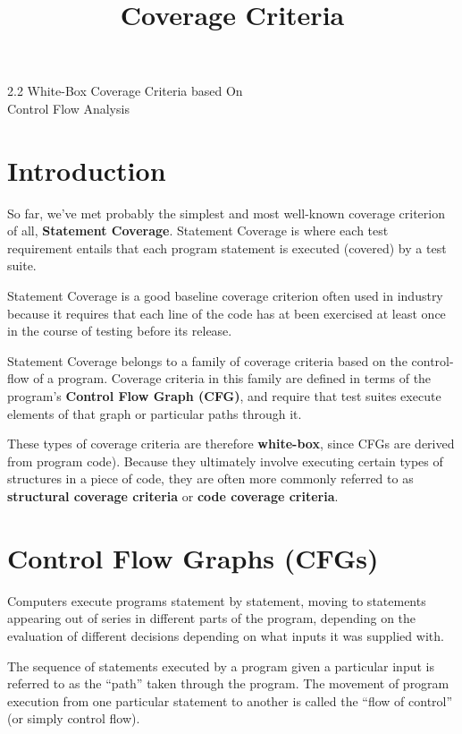 



\title{Coverage Criteria}{2.2 White-Box Coverage Criteria based On\\ Control Flow Analysis}


\section{Introduction}
%
So far, we've met probably the simplest and most well-known coverage criterion
of all, {\bf Statement Coverage}. Statement Coverage is where each test
requirement entails that each program statement is executed (covered) by a test
suite. 

Statement Coverage is a good baseline coverage criterion often used in industry
because it requires that each line of the code has at been exercised at least
once in the course of testing before its release.

Statement Coverage belongs to a family of coverage criteria based on the
control-flow of a program. Coverage criteria in this family are defined in terms
of the program's {\bf Control Flow Graph (CFG)}, and require that test suites
execute elements of that graph or particular paths through it. 

These types of coverage criteria are therefore {\bf white-box}, since CFGs are
derived from program code). Because they ultimately involve executing certain
types of structures in a piece of code, they are often more commonly referred to
as {\bf structural coverage criteria} or {\bf code coverage criteria}.


\section{Control Flow Graphs (CFGs)}


Computers execute programs statement by statement, moving to statements
appearing out of series in different parts of the program, depending on the
evaluation of different decisions depending on what inputs it was supplied with.

The sequence of statements executed by a program given a particular input is
referred to as the ``path'' taken through the program. The movement of program
execution from one particular statement to another is called the ``flow of
control'' (or simply control flow).

